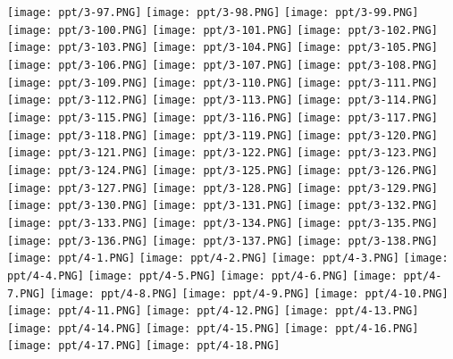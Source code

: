 \documentclass[UTF-8]{ctexart}
\begin{document}
\begin{center}
\texttt{[image: ppt/3-97.PNG]}
\texttt{[image: ppt/3-98.PNG]}
\texttt{[image: ppt/3-99.PNG]}
\texttt{[image: ppt/3-100.PNG]}
\texttt{[image: ppt/3-101.PNG]}
\texttt{[image: ppt/3-102.PNG]}
\texttt{[image: ppt/3-103.PNG]}
\texttt{[image: ppt/3-104.PNG]}
\texttt{[image: ppt/3-105.PNG]}
\texttt{[image: ppt/3-106.PNG]}
\texttt{[image: ppt/3-107.PNG]}
\texttt{[image: ppt/3-108.PNG]}
\texttt{[image: ppt/3-109.PNG]}
\texttt{[image: ppt/3-110.PNG]}
\texttt{[image: ppt/3-111.PNG]}
\texttt{[image: ppt/3-112.PNG]}
\texttt{[image: ppt/3-113.PNG]}
\texttt{[image: ppt/3-114.PNG]}
\texttt{[image: ppt/3-115.PNG]}
\texttt{[image: ppt/3-116.PNG]}
\texttt{[image: ppt/3-117.PNG]}
\texttt{[image: ppt/3-118.PNG]}
\texttt{[image: ppt/3-119.PNG]}
\texttt{[image: ppt/3-120.PNG]}
\texttt{[image: ppt/3-121.PNG]}
\texttt{[image: ppt/3-122.PNG]}
\texttt{[image: ppt/3-123.PNG]}
\texttt{[image: ppt/3-124.PNG]}
\texttt{[image: ppt/3-125.PNG]}
\texttt{[image: ppt/3-126.PNG]}
\texttt{[image: ppt/3-127.PNG]}
\texttt{[image: ppt/3-128.PNG]}
\texttt{[image: ppt/3-129.PNG]}
\texttt{[image: ppt/3-130.PNG]}
\texttt{[image: ppt/3-131.PNG]}
\texttt{[image: ppt/3-132.PNG]}
\texttt{[image: ppt/3-133.PNG]}
\texttt{[image: ppt/3-134.PNG]}
\texttt{[image: ppt/3-135.PNG]}
\texttt{[image: ppt/3-136.PNG]}
\texttt{[image: ppt/3-137.PNG]}
\texttt{[image: ppt/3-138.PNG]}
\newpage
\texttt{[image: ppt/4-1.PNG]}
\texttt{[image: ppt/4-2.PNG]}
\texttt{[image: ppt/4-3.PNG]}
\texttt{[image: ppt/4-4.PNG]}
\texttt{[image: ppt/4-5.PNG]}
\texttt{[image: ppt/4-6.PNG]}
\texttt{[image: ppt/4-7.PNG]}
\texttt{[image: ppt/4-8.PNG]}
\texttt{[image: ppt/4-9.PNG]}
\texttt{[image: ppt/4-10.PNG]}
\texttt{[image: ppt/4-11.PNG]}
\texttt{[image: ppt/4-12.PNG]}
\texttt{[image: ppt/4-13.PNG]}
\texttt{[image: ppt/4-14.PNG]}
\texttt{[image: ppt/4-15.PNG]}
\texttt{[image: ppt/4-16.PNG]}
\texttt{[image: ppt/4-17.PNG]}
\texttt{[image: ppt/4-18.PNG]}

\end{center}
\end{document}
